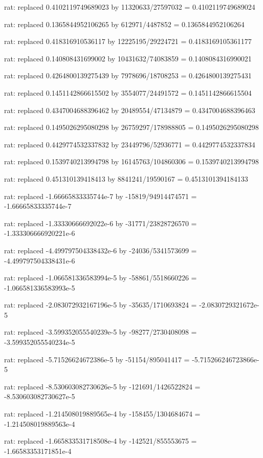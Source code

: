 \documentclass[a4paper,10pt]{article}
\begin{document}
\begin{eulernotebook}
\begin{eulercomment}
\begin{eulercomment}
\begin{eulercomment}
\begin{eulercomment}
\begin{eulercomment}
\begin{eulercomment}
\begin{eulercomment}
\begin{eulercomment}
\begin{eulercomment}
\begin{eulercomment}
\begin{eulercomment}
\begin{eulercomment}
\begin{eulercomment}
\begin{eulercomment}
\begin{eulercomment}
\begin{eulercomment}
\begin{euleroutput}
  rat: replaced 0.4102119749689023 by 11320633/27597032 = 0.4102119749689024
  
  rat: replaced 0.1365844952106265 by 612971/4487852 = 0.1365844952106264
  
  rat: replaced 0.418316910536117 by 12225195/29224721 = 0.4183169105361177
  
  rat: replaced 0.140808431699002 by 10431632/74083859 = 0.1408084316990021
  
  rat: replaced 0.4264800139275439 by 7978696/18708253 = 0.4264800139275431
  
  rat: replaced 0.1451142866615502 by 3554077/24491572 = 0.1451142866615504
  
  rat: replaced 0.4347004688396462 by 20489554/47134879 = 0.4347004688396463
  
  rat: replaced 0.1495026295080298 by 26759297/178988805 = 0.1495026295080298
  
  rat: replaced 0.4429774532337832 by 23449796/52936771 = 0.4429774532337834
  
  rat: replaced 0.1539740213994798 by 16145763/104860306 = 0.1539740213994798
  
  rat: replaced 0.451310139418413 by 8841241/19590167 = 0.4513101394184133
  
  rat: replaced -1.66665833335744e-7 by -15819/94914474571 = -1.66665833335744e-7
  
  rat: replaced -1.33330666692022e-6 by -31771/23828726570 = -1.333306666920221e-6
  
  rat: replaced -4.499797504338432e-6 by -24036/5341573699 = -4.499797504338431e-6
  
  rat: replaced -1.066581336583994e-5 by -58861/5518660226 = -1.066581336583993e-5
  
  rat: replaced -2.083072932167196e-5 by -35635/1710693824 = -2.0830729321672e-5
  
  rat: replaced -3.599352055540239e-5 by -98277/2730408098 = -3.599352055540234e-5
  
  rat: replaced -5.71526624672386e-5 by -51154/895041417 = -5.715266246723866e-5
  
  rat: replaced -8.530603082730626e-5 by -121691/1426522824 = -8.530603082730627e-5
  
  rat: replaced -1.214508019889565e-4 by -158455/1304684674 = -1.214508019889563e-4
  
  rat: replaced -1.665833531718508e-4 by -142521/855553675 = -1.66583353171851e-4
  

\end{euleroutput}
\end{eulercomment}
\end{eulercomment}
\end{eulercomment}
\end{eulercomment}
\end{eulercomment}
\end{eulercomment}
\end{eulercomment}
\end{eulercomment}
\end{eulercomment}
\end{eulercomment}
\end{eulercomment}
\end{eulercomment}
\end{eulercomment}
\end{eulercomment}
\end{eulercomment}
\end{eulercomment}
\end{eulernotebook}
\end{document}
